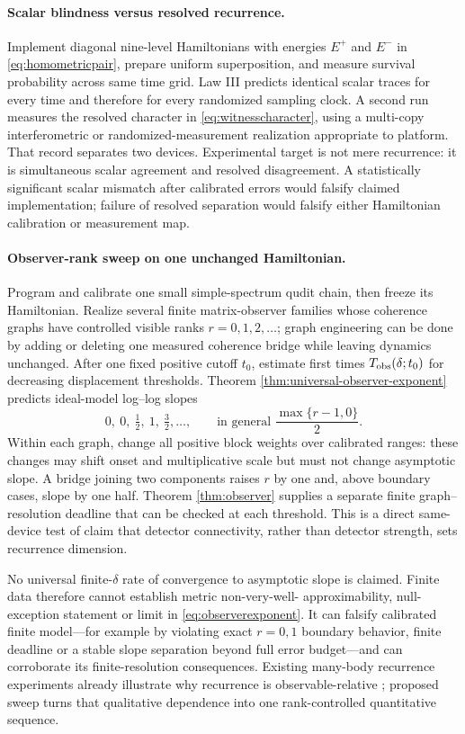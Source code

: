 \paragraph{Scalar blindness versus resolved recurrence.}
Implement diagonal nine-level Hamiltonians with energies $E^+$ and $E^-$ in
\eqref{eq:homometricpair}, prepare uniform superposition, and measure survival
probability across same time grid.  Law III predicts identical scalar traces
for every time and therefore for every randomized sampling clock.  A second
run measures the resolved character in \eqref{eq:witnesscharacter}, using a
multi-copy interferometric or randomized-measurement realization appropriate
to platform.  That record separates two devices.  Experimental target is not
mere recurrence: it is simultaneous scalar agreement and resolved
disagreement.  A statistically significant scalar mismatch after calibrated
errors would falsify claimed implementation; failure of resolved separation
would falsify either Hamiltonian calibration or measurement map.

\paragraph{Observer-rank sweep on one unchanged Hamiltonian.}
Program and calibrate one small simple-spectrum qudit chain, then freeze its
Hamiltonian.  Realize several finite matrix-observer families whose coherence
graphs have controlled visible ranks $r=0,1,2,\ldots$; graph engineering can
be done by adding or deleting one measured coherence bridge while leaving
dynamics unchanged.  After one fixed positive cutoff $t_0$, estimate first
times $T_{\rm obs}(\delta;t_0)$ for decreasing displacement thresholds.
Theorem \ref{thm:universal-observer-exponent} predicts ideal-model log--log
slopes
\[
 0,\ 0,\ \tfrac12,\ 1,\ \tfrac32,\ldots,
 \qquad\text{in general }\frac{\max\{r-1,0\}}2.
\]
Within each graph, change all positive block weights over calibrated ranges:
these changes may shift onset and multiplicative scale but must not change
asymptotic slope.  A bridge joining two components raises $r$ by one and,
above boundary cases, slope by one half.  Theorem \ref{thm:observer} supplies
a separate finite graph--resolution deadline that can be checked at each
threshold.  This is a direct same-device test of claim that detector
connectivity, rather than detector strength, sets recurrence dimension.

No universal finite-$\delta$ rate of convergence to asymptotic slope is
claimed.  Finite data therefore cannot establish metric non-very-well-
approximability, null-exception statement or limit in
\eqref{eq:observerexponent}.  It can falsify calibrated finite model---for
example by violating exact $r=0,1$ boundary behavior, finite deadline or a
stable slope separation beyond full error budget---and can corroborate its
finite-resolution consequences.  Existing many-body recurrence experiments
already illustrate why recurrence is observable-relative
\cite{RauerEtAl2018}; proposed sweep turns that qualitative dependence into
one rank-controlled quantitative sequence.

